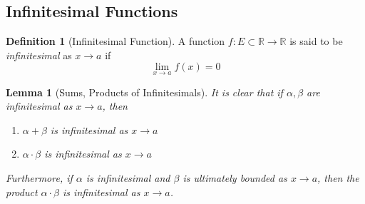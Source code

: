 \documentclass{article}
\newtheorem{lemma}[theorem]{Lemma}
\theoremstyle{remark}
\theoremstyle{definition}
\newtheorem{definition}{Definition}[section]
\begin{document}
\subsection{Infinitesimal Functions}

\begin{definition}[Infinitesimal Function]
A function $f: E \subset \mathbb{R} \longrightarrow \mathbb{R}$ is said to be \textit{infinitesimal} as $x \rightarrow a$ if 
\[\lim_{x \rightarrow a} f(x) = 0\]
\end{definition}

\begin{lemma}[Sums, Products of Infinitesimals]
It is clear that if $\alpha, \beta$ are infinitesimal as $x \rightarrow a$, then 
\begin{enumerate}
    \item $\alpha + \beta$ is infinitesimal as $x \rightarrow a$
    \item $\alpha \cdot \beta$ is infinitesimal as $x \rightarrow a$
\end{enumerate}
Furthermore, if $\alpha$ is infinitesimal and $\beta$ is ultimately bounded as $x \rightarrow a$, then the product $\alpha \cdot \beta$ is infinitesimal as $x \rightarrow a$. 
\end{lemma}
\end{document}

